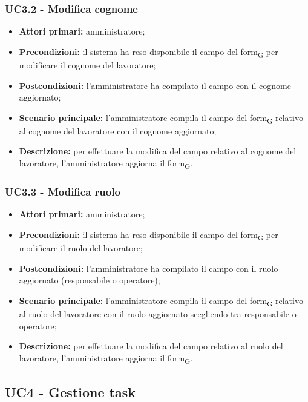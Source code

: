 \subsubsection{UC3.2 - Modifica cognome}

\begin{itemize}
	\item 	\textbf{Attori primari:} amministratore;
	\item 	\textbf{Precondizioni:} il sistema ha reso disponibile il campo del \gls{form}\textsubscript{G} per modificare il cognome del lavoratore;
	\item 	\textbf{Postcondizioni:} l’amministratore ha compilato il campo con il cognome aggiornato;
	\item 	\textbf{Scenario principale:} l’amministratore compila il campo del \gls{form}\textsubscript{G} relativo al cognome del lavoratore con il cognome aggiornato;
	\item 	\textbf{Descrizione:} per effettuare la modifica del campo relativo al cognome del lavoratore, l’amministratore aggiorna il \gls{form}\textsubscript{G}.

\end{itemize}
\subsubsection{UC3.3 - Modifica ruolo}

\begin{itemize}
	\item 	\textbf{Attori primari:} amministratore;
	\item 	\textbf{Precondizioni:} il sistema ha reso disponibile il campo del \gls{form}\textsubscript{G} per modificare il ruolo del lavoratore;
	\item 	\textbf{Postcondizioni:} l’amministratore ha compilato il campo con il ruolo aggiornato (responsabile o operatore);
	\item 	\textbf{Scenario principale:} l’amministratore compila il campo del \gls{form}\textsubscript{G} relativo al ruolo del lavoratore con il ruolo aggiornato scegliendo tra responsabile o operatore;
	\item 	\textbf{Descrizione:} per effettuare la modifica del campo relativo al ruolo del lavoratore, l’amministratore aggiorna il \gls{form}\textsubscript{G}.

\end{itemize}
\subsection{UC4 - Gestione task}

